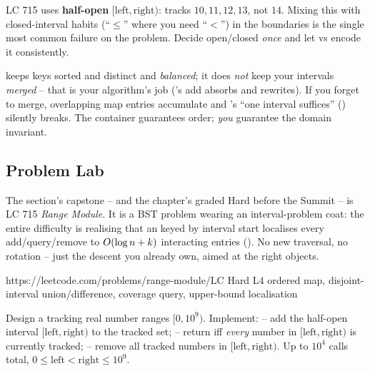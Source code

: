 \begin{warningbox}
LC 715 uses \textbf{half-open} $[\text{left},\text{right})$:  tracks
$10,11,12,13$, not $14$. Mixing this with closed-interval habits (``$\le$'' where you need ``$<$'') in
the  boundaries is the single most common failure on the problem. Decide open/closed
\emph{once} and let  vs  encode it consistently.
\end{warningbox}

\begin{warningbox}
 keeps keys sorted and distinct and \emph{balanced}; it does \emph{not} keep your intervals
\emph{merged} -- that is your algorithm's job ('s add absorbs and rewrites). If you
forget to merge, overlapping map entries accumulate and 's ``one interval suffices''
() silently breaks. The container guarantees order; \emph{you} guarantee the
domain invariant.
\end{warningbox}

\subsection{Problem Lab}

The section's capstone -- and the chapter's graded Hard before the Summit -- is LC 715 \emph{Range
Module}. It is a BST problem wearing an interval-problem coat: the entire difficulty is realising that
an  keyed by interval start localises every add/query/remove to $O(\log n + k)$
interacting entries (). No new traversal, no rotation -- just the descent you
already own, aimed at the right objects.

  {https://leetcode.com/problems/range-module/}{LC Hard L4}
  {ordered map, disjoint-interval union/difference, coverage query, upper-bound localisation}

\begin{problemstatement}
Design a  tracking real number ranges $[0, 10^{9})$. Implement:
\textbf{} -- add the half-open interval $[\text{left},\text{right})$ to the
tracked set; \textbf{} -- return  iff \emph{every} number in
$[\text{left},\text{right})$ is currently tracked; \textbf{} -- remove all
tracked numbers in $[\text{left},\text{right})$. Up to $10^{4}$ calls total, $0\le \text{left}<\text{right}\le 10^{9}$.
\end{problemstatement}

